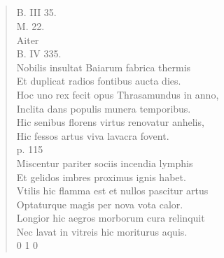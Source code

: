 \documentclass[11pt, a4paper]{report}
\begin{document}
            \subsection*{}
      \begin{verse}
      B. III 35. \\ M. 22. \\ Aiter \\ B. IV 335. \\ Nobilis insultat Baiarum fabrica thermis \\ Et duplicat radios fontibus aucta dies. \\ Hoc uno rex fecit opus Thrasamundus in anno, \\ Inclita dans populis munera temporibus. \\ Hic senibus florens virtus renovatur anhelis, \\ Hic fessos artus viva lavacra fovent. \\ p. 115 \\ Miscentur pariter sociis incendia lymphis \\ Et gelidos imbres proximus ignis habet. \\ Vtilis hic flamma est et nullos pascitur artus \\ Optaturque magis per nova vota calor. \\ Longior hic aegros morborum cura relinquit \\ Nec lavat in vitreis hic moriturus aquis. \\ 0 1 0 \\ 
      \end{verse}
  
\end{document}
